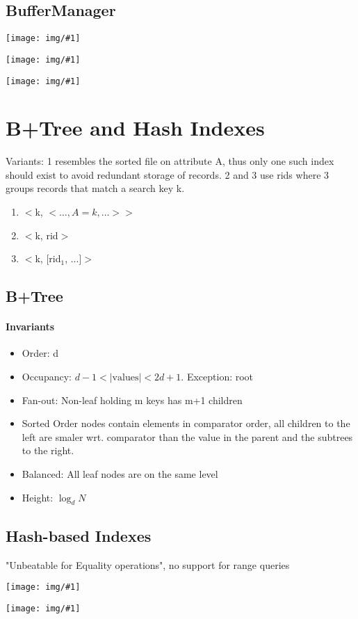 \documentclass[a4paper]{article}
\newcommand{\img}[1]{\begin{center}
    \texttt{[image: img/\#1]}
\end{center} }
\begin{document}
\begin{twocolumn}
\subsection{BufferManager}
\img{replacement_names.png}
\img{replacement_matrix.png}
\img{replacement_graphic.png}

\section{B+Tree and Hash Indexes}
Variants: 1 resembles the sorted file on attribute A, thus only one such index should exist to avoid redundant storage of records. 2 and 3 use rids where 3 groups records that match a search key k.
\begin{enumerate}
	\item $<$k, $< \dots,A=k,\dots>>$
	\item $<$k, rid$>$
	\item $<$k, [rid$_1$, ...]$>$
\end{enumerate}

\subsection{B+Tree}
\paragraph{Invariants}
\begin{itemize}
	\item Order: d
	\item Occupancy: $d-1 < |\text{values}| < 2d+1$. Exception: root
	\item Fan-out: Non-leaf holding m keys has m+1 children
	\item Sorted Order nodes contain elements in comparator order, all children to the left are smaler wrt. comparator than the value in the parent and the subtrees to the right.
	\item Balanced: All leaf nodes are on the same level
	\item Height: $\log_d N$
\end{itemize}

\subsection{Hash-based Indexes}
"Unbeatable for Equality operations", no support for range queries
\img{hash_fn.png}
\img{hash_family.png}


\end{twocolumn}
\end{document}
